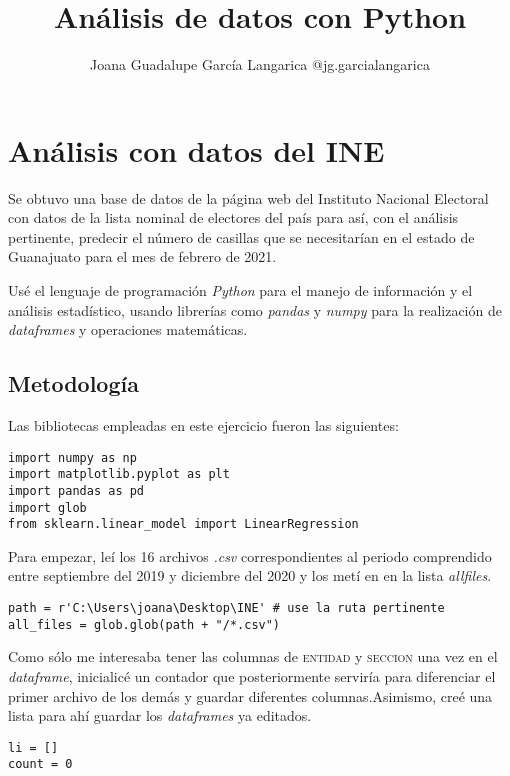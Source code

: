 \documentclass{article}
\title{Análisis de datos con Python}
\author{Joana Guadalupe García Langarica @jg.garcialangarica}
\begin{document}
\maketitle

\section{Análisis con datos del INE}
Se obtuvo una base de datos de la página web del Instituto Nacional Electoral \cite{INE} con datos de la lista nominal de electores del país para así, con el análisis pertinente, predecir el número de casillas que se necesitarían en el estado de Guanajuato para el mes de febrero de 2021.

Usé el lenguaje de programación \textit{Python} para el manejo de información y el análisis estadístico, usando librerías como \textit{pandas} y \textit{numpy} para la realización de \textit{dataframes} y operaciones matemáticas.

\subsection{Metodología}
Las bibliotecas empleadas en este ejercicio fueron las siguientes:

\begin{lstlisting}
import numpy as np
import matplotlib.pyplot as plt
import pandas as pd 
import glob
from sklearn.linear_model import LinearRegression
\end{lstlisting}

Para empezar, leí los 16 archivos \textit{.csv} correspondientes al periodo comprendido entre septiembre del 2019 y diciembre del 2020 y los metí en en la lista \textit{allfiles}. 

\begin{lstlisting}
path = r'C:\Users\joana\Desktop\INE' # use la ruta pertinente
all_files = glob.glob(path + "/*.csv")
\end{lstlisting}

Como sólo me interesaba tener las columnas de \textsc{entidad} y \textsc{seccion} una vez en el \textit{dataframe}, inicialicé un contador que posteriormente serviría para diferenciar el primer archivo de los demás y guardar diferentes columnas.Asimismo, creé una lista para ahí guardar los \textit{dataframes} ya editados.

\begin{lstlisting}
li = []
count = 0
\end{lstlisting}
\end{document}
